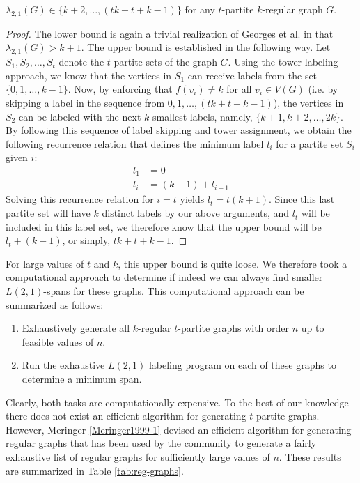\documentclass[12pt]{article}
\begin{document}
\begin{cor}
$\lambda_{2,1}(G) \in \{k+2,\dots,(tk + t + k - 1)\}$ for any $t$-partite $k$-regular graph $G$. 
\end{cor}
\begin{proof}
The lower bound is again a trivial realization of Georges et al. \cite{Georges03} in that $\lambda_{2,1}(G) > k+1$. The upper bound is established in the following way. Let $S_1,S_2,\dots,S_t$ denote the $t$ partite sets of the graph $G$. Using the tower labeling approach, we know that the vertices in $S_1$ can receive labels from the set $\{0,1,\dots,k-1\}$. Now, by enforcing that $f(v_i) \not= k$ for all $v_i \in V(G)$ (i.e. by skipping a label in the sequence from $0,1,\dots,(tk + t + k - 1)$), the vertices in $S_2$ can be labeled with the next $k$ smallest labels, namely, $\{k+1,k+2,\dots,2k\}$. By following this sequence of label skipping and tower assignment, we obtain the following recurrence relation that defines the minimum label $l_i$ for a partite set $S_i$ given $i$:
\begin{align*}
l_1 & = 0 \\
l_i & = (k + 1) + l_{i-1} 
\end{align*}
Solving this recurrence relation for $i = t$ yields $l_t = t(k + 1)$. Since this last partite set will have $k$ distinct labels by our above arguments, and $l_t$ will be included in this label set, we therefore know that the upper bound will be $l_t + (k - 1)$, or simply, $tk + t + k - 1$.
\end{proof}

For large values of $t$ and $k$, this upper bound is quite loose. We therefore took a computational approach to determine if indeed we can always find smaller $L(2,1)$-spans for these graphs. This computational approach can be summarized as follows:
\begin{enumerate}
	\item Exhaustively generate all $k$-regular $t$-partite graphs with order $n$ up to feasible values of $n$.
	\item Run the exhaustive $L(2,1)$ labeling program on each of these graphs to determine a minimum span.
\end{enumerate}
Clearly, both tasks are computationally expensive. To the best of our knowledge there does not exist an efficient algorithm for generating $t$-partite graphs. However, Meringer \ref{Meringer1999-1} devised an efficient algorithm for generating regular graphs that has been used by the community to generate a fairly exhaustive list of regular graphs for sufficiently large values of $n$. These results are summarized in Table \ref{tab:reg-graphs}.
\end{document}
